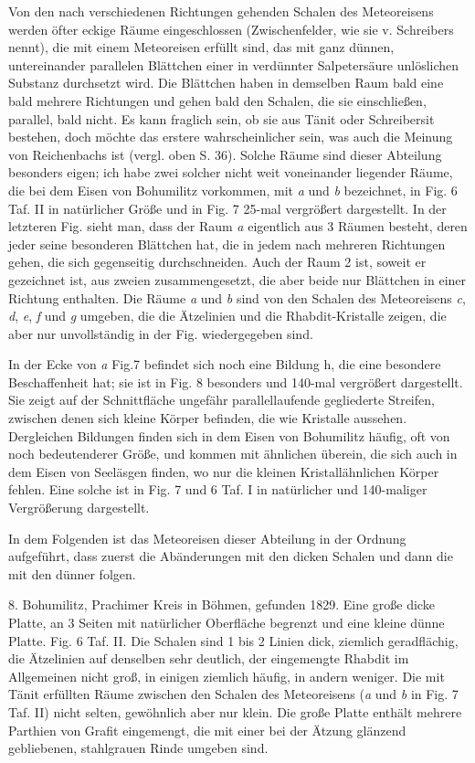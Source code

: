 \documentclass[a4paper, 11pt, oneside]{article}
\begin{document}
Von den nach verschiedenen Richtungen gehenden Schalen des Meteoreisens werden öfter eckige Räume eingeschlossen (Zwischenfelder, wie sie v. Schreibers nennt), die mit einem Meteoreisen erfüllt sind, das mit ganz dünnen, untereinander parallelen Blättchen einer in verdünnter Salpetersäure unlöslichen Substanz durchsetzt wird. Die Blättchen haben in demselben Raum bald eine bald mehrere Richtungen und gehen bald den Schalen, die sie einschließen, parallel, bald nicht. Es kann fraglich sein, ob sie aus Tänit oder Schreibersit bestehen, doch möchte das erstere wahrscheinlicher sein, was auch die Meinung von Reichenbachs ist (vergl. oben S. 36). Solche Räume sind dieser Abteilung besonders eigen; ich habe zwei solcher nicht weit voneinander liegender Räume, die bei dem Eisen von Bohumilitz vorkommen, mit \emph{a} und \emph{b} bezeichnet, in Fig. 6 Taf. II in natürlicher Größe und in Fig. 7 25-mal vergrößert dargestellt. In der letzteren Fig. sieht man, dass der Raum \emph{a} eigentlich aus 3 Räumen besteht, deren jeder seine besonderen Blättchen hat, die in jedem nach mehreren Richtungen gehen, die sich gegenseitig durchschneiden. Auch der Raum 2 ist, soweit er gezeichnet ist, aus zweien zusammengesetzt, die aber beide nur Blättchen in einer Richtung enthalten. Die Räume \emph{a} und \emph{b} sind von den Schalen des Meteoreisens \emph{c}, \emph{d}, \emph{e}, \emph{f} und \emph{g} umgeben, die die Ätzelinien und die Rhabdit-Kristalle zeigen, die aber nur unvollständig in der Fig. wiedergegeben sind.

In der Ecke von \emph{a} Fig.7 befindet sich noch eine Bildung h, die eine besondere Beschaffenheit hat; sie ist in Fig. 8 besonders und 140-mal vergrößert dargestellt. Sie zeigt auf der Schnittfläche ungefähr parallellaufende gegliederte Streifen, zwischen denen sich kleine Körper befinden, die wie Kristalle aussehen. Dergleichen Bildungen finden sich in dem Eisen von Bohumilitz häufig, oft von noch bedeutenderer Größe, und kommen mit ähnlichen überein, die sich auch in dem Eisen von Seeläsgen finden, wo nur die kleinen Kristallähnlichen Körper fehlen. Eine solche ist in Fig. 7 und 6 Taf. I in natürlicher und 140-maliger Vergrößerung dargestellt.

In dem Folgenden ist das Meteoreisen dieser Abteilung in der Ordnung aufgeführt, dass zuerst die Abänderungen mit den dicken Schalen und dann die mit den dünner folgen.

8. Bohumilitz, Prachimer Kreis in Böhmen, gefunden 1829. Eine große dicke Platte, an 3 Seiten mit natürlicher Oberfläche begrenzt und eine kleine dünne Platte. Fig. 6 Taf. II. Die Schalen sind 1 bis 2 Linien dick, ziemlich geradflächig, die Ätzelinien auf denselben sehr deutlich, der eingemengte Rhabdit im Allgemeinen nicht groß, in einigen ziemlich häufig, in andern weniger. Die mit Tänit erfüllten Räume zwischen den Schalen des Meteoreisens (\emph{a} und \emph{b} in Fig. 7 Taf. II) nicht selten, gewöhnlich aber nur klein. Die große Platte enthält mehrere Parthien von Grafit eingemengt, die mit einer bei der Ätzung glänzend gebliebenen, stahlgrauen Rinde umgeben sind.
\end{document}
